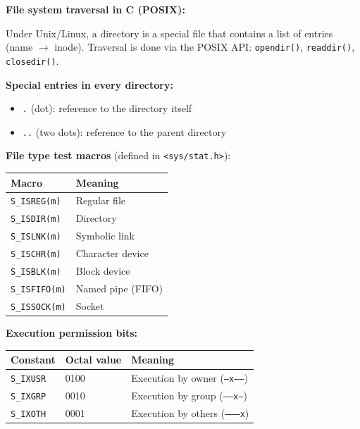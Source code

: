 \documentclass[a4paper,11pt]{article}
\theoremstyle{plain}
\theoremstyle{definition}
\begin{document}
\begin{rappel}
\textbf{File system traversal in C (POSIX):}

Under Unix/Linux, a directory is a special file that contains a list of entries (name $\rightarrow$ inode). Traversal is done via the POSIX API: \texttt{opendir()}, \texttt{readdir()}, \texttt{closedir()}.

\medskip
\textbf{Special entries in every directory:}
\begin{itemize}
    \item \texttt{.} (dot): reference to the directory itself
    \item \texttt{..} (two dots): reference to the parent directory
\end{itemize}

\medskip
\textbf{File type test macros} (defined in \texttt{<sys/stat.h>}):
\begin{center}
\begin{tabular}{ll}
\toprule
\textbf{Macro} & \textbf{Meaning} \\
\midrule
\texttt{S\_ISREG(m)} & Regular file \\
\texttt{S\_ISDIR(m)} & Directory \\
\texttt{S\_ISLNK(m)} & Symbolic link \\
\texttt{S\_ISCHR(m)} & Character device \\
\texttt{S\_ISBLK(m)} & Block device \\
\texttt{S\_ISFIFO(m)} & Named pipe (FIFO) \\
\texttt{S\_ISSOCK(m)} & Socket \\
\bottomrule
\end{tabular}
\end{center}

\medskip
\textbf{Execution permission bits:}
\begin{center}
\begin{tabular}{lll}
\toprule
\textbf{Constant} & \textbf{Octal value} & \textbf{Meaning} \\
\midrule
\texttt{S\_IXUSR} & 0100 & Execution by owner (\texttt{--x------}) \\
\texttt{S\_IXGRP} & 0010 & Execution by group (\texttt{-----x---}) \\
\texttt{S\_IXOTH} & 0001 & Execution by others (\texttt{--------x}) \\
\bottomrule
\end{tabular}
\end{center}


\end{rappel}
\end{document}
